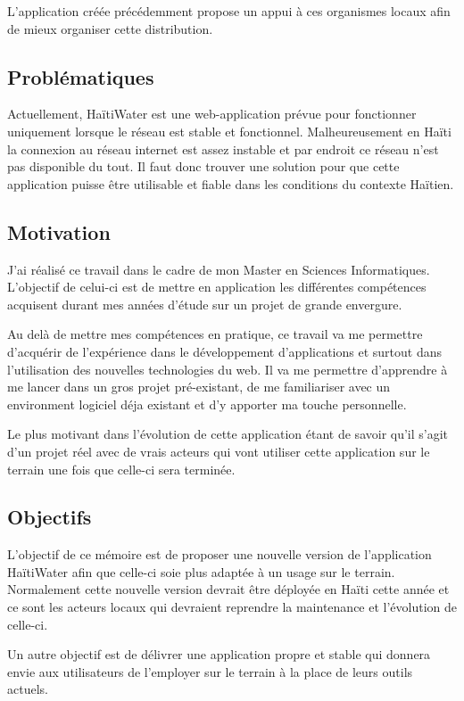 \documentclass{EPL-master-thesis-covers-FR}
\begin{document}
			L'application \cite{ref:haitiwater} créée précédemment propose un appui à ces organismes locaux afin de mieux organiser cette distribution. 

			

		\subsection*{Problématiques}
			Actuellement, HaïtiWater est une web-application prévue pour fonctionner uniquement lorsque le réseau est stable et fonctionnel. Malheureusement en Haïti la connexion au réseau internet est assez instable et par endroit ce réseau n'est pas disponible du tout. Il faut donc trouver une solution pour que cette application puisse être utilisable et fiable dans les conditions du contexte Haïtien. 


		\subsection*{Motivation}
			J'ai réalisé ce travail dans le cadre de mon Master en Sciences Informatiques. L'objectif de celui-ci est de mettre en application les différentes compétences acquisent durant mes années d'étude sur un projet de grande envergure.
			
			Au delà de mettre mes compétences en pratique, ce travail va me permettre d'acquérir de l'expérience dans le développement d'applications et surtout dans l'utilisation des nouvelles technologies du web. Il va me permettre d'apprendre à me lancer dans un gros projet pré-existant, de me familiariser avec un environment logiciel déja existant et d'y apporter ma touche personnelle.	
			
			Le plus motivant dans l'évolution de cette application étant de savoir qu'il s'agit d'un projet réel avec de vrais acteurs qui vont utiliser cette application sur le terrain une fois que celle-ci sera terminée.

		\subsection*{Objectifs}
			L'objectif de ce mémoire est de proposer une nouvelle version de l'application HaïtiWater afin que celle-ci soie plus adaptée à un usage sur le terrain. Normalement cette nouvelle version devrait être déployée en Haïti cette année et ce sont les acteurs locaux qui devraient reprendre la maintenance et l'évolution de celle-ci.
			
			Un autre objectif est de délivrer une application propre et stable qui donnera envie aux utilisateurs de l'employer sur le terrain à la place de leurs outils actuels.
\end{document}
